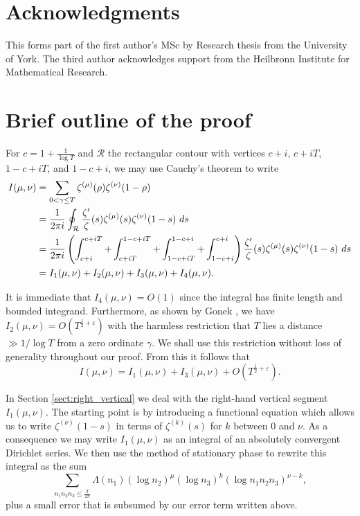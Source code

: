 \documentclass[12pt, a4paper,reqno]{amsart}
\theoremstyle{definition}
\numberwithin{equation}{section}
\begin{document}
\section*{Acknowledgments}
This forms part of the first author's MSc by Research thesis \cite{Durkan} from the University of York. The third author acknowledges support from the Heilbronn Institute for Mathematical Research.


\section{Brief outline of the proof}

For $c=1+\frac{1}{\log T}$ and $\mathcal{R}$ the rectangular contour with vertices $c+i$, $c+i T$, $1-c+iT$, and $1-c+i$,  we may use Cauchy's theorem to write
\begin{align}
    I(\mu,\nu)&=\sum_{0<\gamma\le T}\zeta^{(\mu)}(\rho)\zeta^{(\nu)}(1-\rho) \notag\\
    &=\frac{1}{2\pi i}\oint_{\mathcal{R}}\frac{\zeta'}{\zeta}(s)\zeta^{(\mu)}(s)\zeta^{(\nu)}(1-s)\ ds \notag\\
    &=\frac{1}{2\pi i}\left(\int_{c+i}^{c+iT}+\int_{c+iT}^{1-c+iT}+\int_{1-c+iT}^{1-c+i}+\int_{1-c+i}^{c+i}\right)\frac{\zeta'}{\zeta}(s)\zeta^{(\mu)}(s)\zeta^{(\nu)}(1-s)\ ds \notag\\
    &= I_1(\mu,\nu)+I_2(\mu,\nu)+I_3(\mu,\nu)+I_4(\mu,\nu). \label{eq:defI3}
\end{align}

It is immediate that $I_4(\mu,\nu)=O(1)$ since the integral has finite length and bounded integrand. Furthermore, as shown by Gonek \cite{Gonek1984}, we have $I_2(\mu,\nu)=O\left(T^{\frac{1}{2}+\varepsilon}\right)$ with the harmless restriction 
that $T$ lies a distance $\gg 1/\log T$ from a zero ordinate $\gamma$. We shall use this restriction without loss of generality throughout our proof. From this it follows that 
\begin{equation}\label{eq:I_I1_I3}
    I(\mu,\nu)=I_1(\mu,\nu)+I_3(\mu,\nu)+O\left(T^{\frac{1}{2}+\varepsilon}\right).
\end{equation}

In Section \ref{sect:right_vertical} we deal with the right-hand vertical segment $I_1(\mu,\nu)$. The starting point is by introducing a functional equation which allows us to write $\zeta^{(\nu)}(1-s)$ in terms of $\zeta^{(k)}(s)$ for $k$ between $0$ and $\nu$. As a consequence we may write $I_1(\mu,\nu)$ as an integral of an absolutely convergent Dirichlet series. We then use the method of stationary phase to rewrite this integral as the sum
\begin{equation*}
    \sum_{n_1 n_2 n_3\le\frac{T}{2\pi}}\Lambda(n_1) (\log n_2)^{\mu} (\log n_3)^k (\log n_1 n_2 n_3)^{\nu-k},
\end{equation*}
plus a small error that is subsumed by our error term written above.
\end{document}

